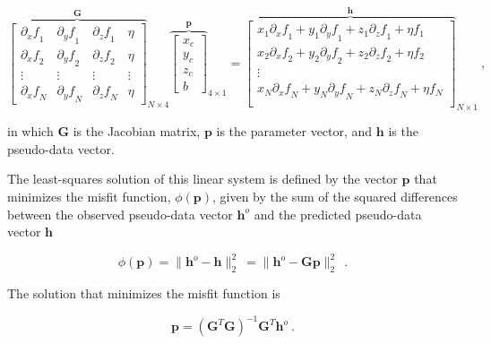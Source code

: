 \documentclass[onecolumn,12pt,a4paper]{article}
\begin{document}
    \begin{equation}
    {\overbrace{
    \begin{bmatrix}
      {\partial_x f}_1 & {\partial_y f}_1 & {\partial_z f}_1 & \eta \\
      {\partial_x f}_2 & {\partial_y f}_2 & {\partial_z f}_2 & \eta \\
      \vdots & \vdots & \vdots & \vdots \\
      {\partial_x f}_N & {\partial_y f}_N & {\partial_z f}_N & \eta
    \end{bmatrix}
    }^{\mathbf{G}}}_{N \times 4}
    {\overbrace{
    \begin{bmatrix}
      x_c \\ y_c \\ z_c \\ b
    \end{bmatrix}
    }^{\mathbf{p}}}_{4 \times 1}
    =
    {\overbrace{
    \begin{bmatrix}
      x_1 {\partial_x f}_1 + y_1 {\partial_y f}_1 + z_1 {\partial_z f}_1 + \eta f_1 \\
      x_2 {\partial_x f}_2 + y_2 {\partial_y f}_2 + z_2 {\partial_z f}_2 + \eta f_2 \\
      \vdots \\
      x_N {\partial_x f}_N + y_N {\partial_y f}_N + z_N {\partial_z f}_N + \eta f_N \\
    \end{bmatrix}
    }^{\mathbf{h}}}_{N \times 1}
    \ ,
    \end{equation}

    \noindent
    in which $\mathbf{G}$ is the Jacobian matrix, $\mathbf{p}$ is the parameter vector, and $\mathbf{h}$ is the pseudo-data vector.

    The least-squares solution of this linear system is defined by the vector $\mathbf{p}$ that minimizes the misfit function, $\phi(\mathbf{p})$, given by the sum of the squared differences between the observed pseudo-data vector $\mathbf{h}^o$ and the predicted pseudo-data vector $\mathbf{h}$

    \begin{equation}
    \label{function_phi}
    \phi(\mathbf{p}) 
    = \| \mathbf{h}^o - \mathbf{h} \|_2^2\ 
    = \| \mathbf{h}^o - \mathbf{G}\mathbf{p} \|_2^2\
    \ .
    \end{equation}

    \noindent
    The solution that minimizes the misfit function is

    \begin{equation}
    \label{euler_solution}
    \mathbf{p} = \left(\mathbf{G}^T \mathbf{G}\right)^{-1} \mathbf{G}^T \mathbf{h}^o\ .
    \end{equation}
\end{document}
